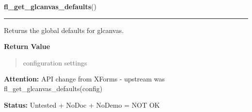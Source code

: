 \hspace{.8\funcindent}\begin{boxedminipage}{\funcwidth}

    \raggedright \textbf{fl\_get\_glcanvas\_defaults}()

    \vspace{-1.5ex}

    \rule{\textwidth}{0.5\fboxrule}
\setlength{\parskip}{2ex}
    Returns the global defaults for glcanvas.

\setlength{\parskip}{1ex}
      \textbf{Return Value}
    \vspace{-1ex}

      \begin{quote}
      configuration settings

      \end{quote}

\textbf{Attention:} API change from XForms - upstream was fl\_get\_glcanvas\_defaults(config)



\textbf{Status:} Untested + NoDoc + NoDemo = NOT OK



    \end{boxedminipage}

    \label{xformslib:library:fl_set_glcanvas_attributes}

    \vspace{0.5ex}

